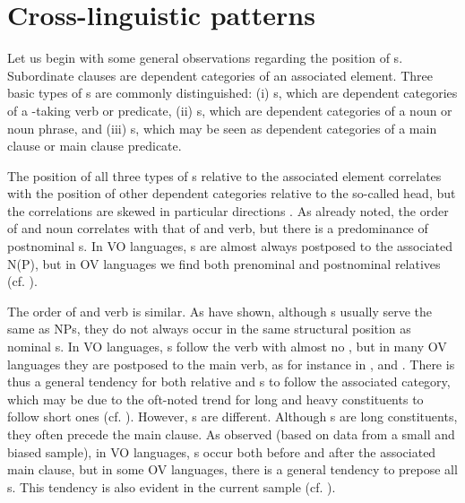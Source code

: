 \documentclass[output=paper]{langsci/langscibook}
\begin{document}
\section{Cross-linguistic patterns}\label{sec:diessel:2}

Let us begin with some general observations regarding the position of s. Subordinate clauses are dependent categories of an associated element. Three basic types of s are commonly distinguished: 
(i) s, which are dependent categories of a -taking verb or predicate, 
(ii) s, which are dependent categories of a noun or noun phrase, and 
(iii) s, which may be seen as dependent categories of a main clause or main clause predicate. 

The position of all three types of s relative to the associated element correlates with the position of other dependent categories relative to the so-called head, but the correlations are skewed in particular directions \citep{Diessel2001}. As \citet{Greenberg1963} already noted, the order of  and noun correlates with that of  and verb, but there is a predominance of postnominal s. In VO languages, s are almost always postposed to the associated N(P), but in OV languages we find both prenominal and postnominal relatives (cf. \citealt{Dryer2005_Rel}). 

The order of  and verb is similar. As \citet{Schmidtke-BodeDiessel2017} have shown, although  s usually serve the same  as  NPs, they do not always occur in the same structural position as nominal s. In VO languages, s follow the verb with almost no , but in many OV languages they are postposed to the main verb, as for instance in ,  and . There is thus a general tendency for both relative and s to follow the associated category, which may be due to the oft-noted trend for long and heavy constituents to follow short ones (cf. \citealt{Behaghel1932}).
\newpage
However, s are different. Although s are long constituents, they often precede the main clause. As \citet{Diessel2001} observed (based on data from a small and biased sample), in VO languages, s occur both before and after the associated main clause, but in some OV languages, there is a general tendency to prepose all s. This tendency is also evident in the current sample (cf. ).
\end{document}
